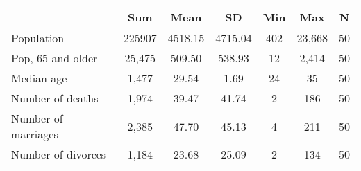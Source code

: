 {
\def\sym#1{\ifmmode^{#1}\else\(^{#1}\)\fi}
\begin{tabular}{l*{1}{cccccc}}
\toprule
                    &         Sum&        Mean&          SD&         Min&         Max&           N\\
\midrule
Population          &      225907&     4518.15&     4715.04&         402&      23,668&          50\\
Pop, 65 and older   &      25,475&      509.50&      538.93&          12&       2,414&          50\\
Median age          &       1,477&       29.54&        1.69&          24&          35&          50\\
Number of deaths    &       1,974&       39.47&       41.74&           2&         186&          50\\
Number of marriages &       2,385&       47.70&       45.13&           4&         211&          50\\
Number of divorces  &       1,184&       23.68&       25.09&           2&         134&          50\\
\bottomrule
\end{tabular}
}
